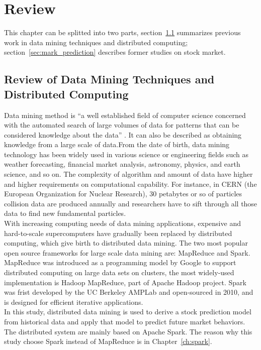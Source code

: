 \chapter{Review}
\label{ch:review}

This chapter can be splitted into two parts, section~\ref{sec:dm_dc} summarizes previous work in data mining techniques and distributed computing; section~\ref{sec:mark_prediction} describes former studies on stock market.

\section{Review of Data Mining Techniques and Distributed Computing}
\label{sec:dm_dc}
Data mining method is ``a well established field of computer science concerned with the automated search of large volumes of data for patterns that can be considered knowledge about the data'' \cite{dubitzky2008data}. It can also be described as obtaining knowledge from a large scale of data.From the date of birth, data mining technology has been widely used in various science or engineering fields such as weather forecasting, financial market analysis, astronomy, physics, and earth science, and so on. The complexity of algorithm and amount of data have higher and higher requirements on computational capability. For instance, in CERN (the European Organization for Nuclear Research), 30 petabytes or so of particles collision data are produced annually and researchers have to sift through all those data to find new fundamental particles.\cite{O'Luanaigh:1997391}\\ 


With increasing computing needs of data mining applications, expensive and hard-to-scale supercomputers have gradually been replaced by distributed computing, which give birth to distributed data mining. The two most popular open source frameworks for large scale data mining are: MapReduce and Spark. MapReduce was introduced as a programming model by Google to support distributed computing on large data sets on clusters, the most widely-used implementation is Hadoop MapReduce, part of Apache Hadoop project\cite[Chapter~3]{sammer2012hadoop}. Spark was frist developed by the UC Berkeley AMPLab and open-sourced in 2010, and is designed for efficient iterative applications\cite{meng2016mllib}.\\

In this study, distributed data mining is used to derive a stock prediction model from historical data and apply that model to predict future market behaviors. The distributed system are mainly based on Apache Spark. The reason why this study choose Spark instead of MapReduce is in Chapter~\ref{ch:spark}.\\
 


